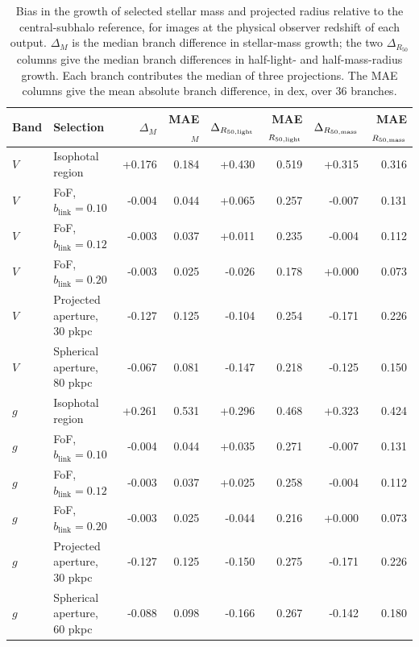 \documentclass[usenatbib]{mnras}
\begin{document}
\begin{table}[t]
\centering
\footnotesize
\setlength{\tabcolsep}{3pt}
\begin{tabular*}{\textwidth}{@{\extracolsep{\fill}}llrrrrrr@{}}
\toprule
Band & Selection & $\Delta_M$ & MAE$_M$ & $\Delta_{R_{50,\rm light}}$ & MAE$_{R_{50,\rm light}}$ & $\Delta_{R_{50,\rm mass}}$ & MAE$_{R_{50,\rm mass}}$ \\
\midrule
$V$ & Isophotal region & +0.176 & 0.184 & +0.430 & 0.519 & +0.315 & 0.316 \\
$V$ & FoF, $b_{\mathrm{link}}=0.10$ & -0.004 & 0.044 & +0.065 & 0.257 & -0.007 & 0.131 \\
$V$ & FoF, $b_{\mathrm{link}}=0.12$ & -0.003 & 0.037 & +0.011 & 0.235 & -0.004 & 0.112 \\
$V$ & FoF, $b_{\mathrm{link}}=0.20$ & -0.003 & 0.025 & -0.026 & 0.178 & +0.000 & 0.073 \\
$V$ & Projected aperture, 30 pkpc & -0.127 & 0.125 & -0.104 & 0.254 & -0.171 & 0.226 \\
$V$ & Spherical aperture, 80 pkpc & -0.067 & 0.081 & -0.147 & 0.218 & -0.125 & 0.150 \\
$g$ & Isophotal region & +0.261 & 0.531 & +0.296 & 0.468 & +0.323 & 0.424 \\
$g$ & FoF, $b_{\mathrm{link}}=0.10$ & -0.004 & 0.044 & +0.035 & 0.271 & -0.007 & 0.131 \\
$g$ & FoF, $b_{\mathrm{link}}=0.12$ & -0.003 & 0.037 & +0.025 & 0.258 & -0.004 & 0.112 \\
$g$ & FoF, $b_{\mathrm{link}}=0.20$ & -0.003 & 0.025 & -0.044 & 0.216 & +0.000 & 0.073 \\
$g$ & Projected aperture, 30 pkpc & -0.127 & 0.125 & -0.150 & 0.275 & -0.171 & 0.226 \\
$g$ & Spherical aperture, 60 pkpc & -0.088 & 0.098 & -0.166 & 0.267 & -0.142 & 0.180 \\
\bottomrule
\end{tabular*}
\caption{Bias in the growth of selected stellar mass and projected radius
relative to the central-subhalo reference, for images at the physical
observer redshift of each output. $\Delta_M$ is the median branch difference
in stellar-mass growth; the two $\Delta_{R_{50}}$ columns give the median
branch differences in half-light- and half-mass-radius growth. Each branch
contributes the median of three projections. The MAE columns give the mean
absolute branch difference, in dex, over 36 branches.}
\label{tab:growth-methods}
\end{table}
\end{document}
